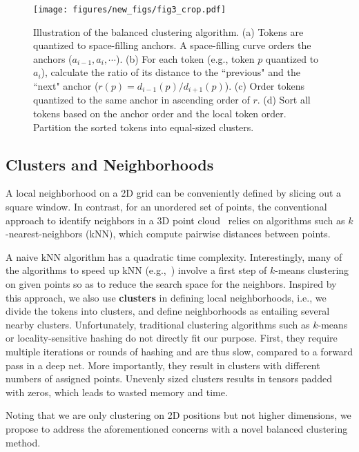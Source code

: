 \documentclass[10pt,twocolumn,letterpaper]{article}
\begin{document}
\begin{figure}
\texttt{[image: figures/new\_figs/fig3\_crop.pdf]} 
\vskip -0.05in
\caption{Illustration of the balanced clustering algorithm. (a) Tokens are quantized to space-filling anchors. A space-filling curve orders the anchors ($a_{i-1}, a_{i}, \cdots$). (b) For each token (e.g., token $p$ quantized to $a_i$), calculate the ratio of its distance to the ``previous" and the ``next" anchor ($r(p)=d_{i-1}(p) / d_{i+1}(p)$). (c) Order tokens quantized to the same anchor in ascending order of $r$. (d) Sort all tokens based on the anchor order and the local token order. Partition the sorted tokens into equal-sized clusters.}
\label{fig:cluster}
\vskip -0.2in
\end{figure}

\subsection{Clusters and Neighborhoods}\label{sec:cluster}

A local neighborhood on a 2D grid can be conveniently defined by slicing out a square window. In contrast, for an unordered set of points, the conventional approach to identify neighbors in a 3D point cloud~\cite{pointnet++,pointconv} relies on algorithms such as $k$-nearest-neighbors (kNN), which compute pairwise distances between points.

A naive kNN algorithm has a quadratic time complexity. Interestingly, many of the algorithms to speed up kNN (e.g.,~\cite{faiss}) involve a first step of $k$-means clustering on given points so as to reduce the search space for the neighbors. 
Inspired by this approach, we also use 
\textbf{clusters} in defining local neighborhoods, i.e., we  
divide the tokens into clusters, and define neighborhoods as entailing several nearby clusters. Unfortunately, traditional clustering algorithms such as $k$-means or locality-sensitive hashing do not directly fit our purpose. First, they require multiple iterations or rounds of hashing and are thus slow, compared to a forward pass in a deep net. More importantly, they result in clusters with different numbers of assigned points. Unevenly sized clusters results in tensors padded with zeros, which leads to wasted memory and time. 

Noting that we are only clustering on 2D positions but not higher dimensions, we propose to address the aforementioned concerns with a novel balanced clustering method.
\end{document}
